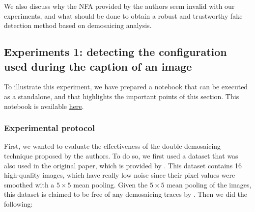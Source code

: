 \documentclass[sigconf, nonacm]{acmart}
\begin{document}
We also discuss why the NFA provided by the authors seem invalid with our experiments, and what should be done to obtain a robust and trustworthy fake detection method based on demosaicing analysis.

\subsection{Experiments 1: detecting the configuration used during the caption of an image} \label{sec:experiment_1}

To illustrate this experiment, we have prepared a notebook that can be executed as a standalone, and that highlights the important points of this section. This notebook is available \href{https://github.com/DentanJeremie/demosaicing-detection/blob/main/doc/configuration_detection_demonstration.ipynb}{\underline{here}}.

\subsubsection{Experimental protocol} 

First, we wanted to evaluate the effectiveness of the double demosaicing technique proposed by the authors. To do so, we first used a dataset that was also used in the original paper, which is provided by \cite{colom_noise_2023}. This dataset contains 16 high-quality images, which have really low noise since their pixel values were smoothed with a $5 \times 5$ mean pooling. Given the $5 \times 5$ mean pooling of the images, this dataset is claimed to be free of any demosaicing traces by \cite{bammey_demosaicing_2022}. Then we did the following:
\end{document}
